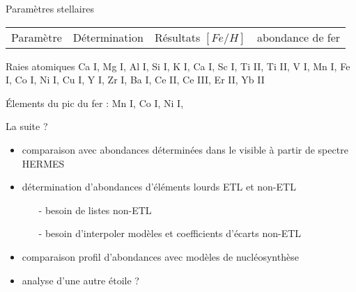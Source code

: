 \documentclass[10pt]{beamer}
\begin{document}
\begin{frame}[fragile]{Paramètres stellaires}







\begin{table}[h!]
    \begin{center}
        \begin{tabular}{c|cc}
            Paramètre & Détermination & Résultats
            $[Fe/H]$ &  abondance de fer & 
        \end{tabular}
    \end{center}
\end{table}

\end{frame}

\begin{frame}[fragile]{Raies atomiques}
    Ca I, Mg I, Al I, Si I, K I, Ca I, Sc I, Ti II, Ti II, V I, Mn I, Fe I, Co I, Ni I, Cu I, Y I, Zr I, Ba I, Ce II, Ce III, Er II, Yb II

    Élements du pic du fer  : Mn I, Co I, Ni I, 
\end{frame}

\begin{frame}[fragile]{La suite ?}
    \begin{itemize}
        \item comparaison avec abondances déterminées dans le visible à partir de spectre HERMES
        \item détermination  d'abondances d'éléments lourds ETL et non-ETL
        \begin{itemize}
            \item [-] besoin de listes non-ETL
            \item [-] besoin d'interpoler modèles et coefficients d'écarts non-ETL
        \end{itemize}
        \item comparaison profil d'abondances avec modèles de nucléosynthèse
        \item analyse d'une autre étoile ?
    \end{itemize} 
\end{frame}
\end{document}
